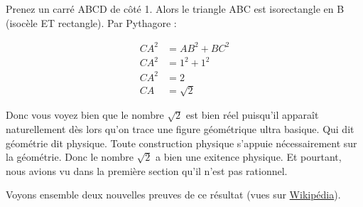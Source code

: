 \documentclass[a4paper, 11pt, twoside]{article}
\begin{document}
Prenez un carré ABCD de côté 1. Alors le triangle ABC est
isorectangle en B (isocèle ET rectangle). Par Pythagore :

\begin{align*}
 CA^2 &= AB^2 + BC^2\\
 CA^2 &= 1^2 + 1^2\\
 CA^2 &= 2\\
 CA &= \sqrt{2}
\end{align*}

Donc vous voyez bien que le nombre \(\sqrt{2}\) est bien réel
puisqu'il apparaît naturellement dès lors qu'on trace une figure
géométrique ultra basique. Qui dit géométrie dit physique. Toute
construction physique s'appuie nécessairement sur la
géométrie. Donc le nombre \(\sqrt{2}\) a bien une exitence
physique. Et pourtant, nous avions vu dans la première section
qu'il n'est pas rationnel.

Voyons ensemble deux nouvelles preuves de ce résultat (vues sur
\href{https://fr.wikipedia.org/wiki/Racine\_carr\%C3\%A9e\_de\_deux\#Preuves\_d'irrationalit\%C3\%A9}{Wikipédia}).
\end{document}
